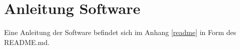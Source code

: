 \section{Anleitung Software}

Eine Anleitung der Software befindet sich im Anhang \ref{readme} in Form des README.md.

%
%
%
%
%
%
%
%
%
%
